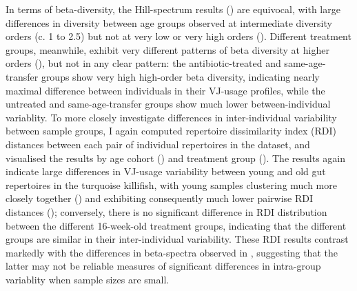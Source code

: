 In terms of beta-diversity, the Hill-spectrum results () are equivocal, with large differences in diversity between age groups observed at intermediate diversity orders (c. 1 to 2.5) but not at very low or very high orders (). Different treatment groups, meanwhile, exhibit very different patterns of beta diversity at higher orders (), but not in any clear pattern: the antibiotic-treated and same-age-transfer groups show very high high-order beta diversity, indicating nearly maximal difference between individuals in their VJ-usage profiles, while the untreated and same-age-transfer groups show much lower between-individual variablity. To more closely investigate differences in inter-individual variability between sample groups, I again computed repertoire dissimilarity index (RDI) distances between each pair of individual repertoires in the dataset, and visualised the results by age cohort () and treatment group (). The results again indicate large differences in VJ-usage variability between young and old gut repertoires in the turquoise killifish, with young samples clustering much more closely together () and exhibiting consequently much lower pairwise RDI distances (); conversely, there is no significant difference in RDI distribution between the different 16-week-old treatment groups, indicating that the different groups are similar in their inter-individual variability. These RDI results contrast markedly with the differences in beta-spectra observed in , suggesting that the latter may not be reliable measures of significant differences in intra-group variablity when sample sizes are small.

